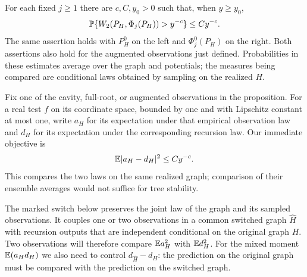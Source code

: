 \begin{proposition}\label{prop:empirical-recursion}
For each fixed $j\ge1$ there are $c,C,y_0>0$ such that, when $y\ge y_0$,
\begin{equation}\label{eq:empirical-recursion}
 \mathbb P\{W_2(P_H,\Phi_j(P_H))>y^{-c}\}\le Cy^{-c}.
\end{equation}
The same assertion holds with $P_H^0$ on the left and
$\Phi_j^0(P_H)$ on the right.  Both assertions also hold for the
augmented observations just defined.  Probabilities in these estimates
average over the graph and potentials; the measures being compared
are conditional laws obtained by sampling on the realized $H$.
\end{proposition}

Fix one of the cavity, full-root, or augmented observations in the
proposition.  For a real test $f$ on its coordinate space, bounded by one
and with Lipschitz constant at most one, write $a_H$ for its expectation under that
empirical observation law and $d_H$ for its expectation under the
corresponding recursion law.  Our immediate objective is
\[
                         \mathbb E|a_H-d_H|^2\le Cy^{-c}.
\]
This compares the two laws on the same realized graph; comparison of
their ensemble averages would not suffice for tree stability.

The marked switch below preserves the joint law of the graph and its
sampled observations.  It couples one or two observations in a common
switched graph $\widehat H$ with recursion outputs that are independent
conditional on the original graph $H$.  Two observations will therefore compare
$\mathbb E a_H^2$ with $\mathbb E d_H^2$.  For the mixed moment
$\mathbb E(a_Hd_H)$ we also need to control $d_{\widehat H}-d_H$:
the prediction on the original graph must be compared with the
prediction on the switched graph.


